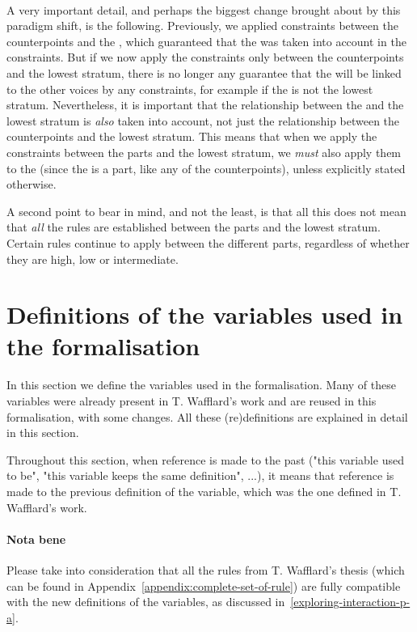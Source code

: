 \paragraph{}
A very important detail, and perhaps the biggest change brought about by this paradigm shift, is the following. Previously, we applied constraints between the counterpoints and the \cf, which guaranteed that the \cfs was taken into account in the constraints. But if we now apply the constraints only between the counterpoints and the lowest stratum, there is no longer any guarantee that the \cfs will be linked to the other voices by any constraints, for example if the \cfs is not the lowest stratum. Nevertheless, it is important that the relationship between the \cfs and the lowest stratum is \textit{also} taken into account, not just the relationship between the counterpoints and the lowest stratum. This means that when we apply the constraints between the parts and the lowest stratum, we \textit{must} also apply them to the \cfs (since the \cfs is a part, like any of the counterpoints), unless explicitly stated otherwise. 

A second point to bear in mind, and not the least, is that all this does not mean that \textit{all} the rules are established between the parts and the lowest stratum. Certain rules continue to apply between the different parts, regardless of whether they are high, low or intermediate.

\section{Definitions of the variables used in the formalisation} \label{section:changes induced}
In this section we define the variables used in the formalisation. Many of these variables were already present in T. Wafflard's work and are reused in this formalisation, with some changes. All these (re)definitions are explained in detail in this section.

Throughout this section, when reference is made to the past ("this variable used to be", "this variable keeps the same definition", ...), it means that reference is made to the previous definition of the variable, which was the one defined in T. Wafflard's work.

\paragraph{Nota bene}
Please take into consideration that all the rules from T. Wafflard's thesis (which can be found in Appendix~\ref{appendix:complete-set-of-rule}) are fully compatible with the new definitions of the variables, as discussed in~\ref{exploring-interaction-p-a}. 

